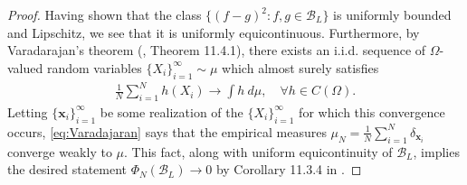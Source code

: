 \documentclass{article}
\def\vx{{\bm{x}}}
\def\cB{{\mathcal{B}}}
\begin{document}
\begin{appendices}
\begin{proof}
    Having shown that the class $\{ (f-g)^2: f,g \in \cB_L \}$ is uniformly bounded and Lipschitz, we see that it is uniformly equicontinuous. Furthermore, by Varadarajan's theorem (\cite{dudley2002real}, Theorem 11.4.1), there exists an i.i.d. sequence of $\Omega$-valued random variables $\{ X_i \}_{i=1}^\infty \sim \mu$ which almost surely satisfies
    \begin{align} \label{eq:Varadajaran}
        \frac{1}{N} \sum_{i=1}^N h(X_i) \to \int h \ d \mu, \quad \forall h \in C(\Omega).
    \end{align}
    Letting $\{ \vx_i \}_{i=1}^\infty$ be some realization of the $\{ X_i \}_{i=1}^\infty$ for which this convergence occurs, \eqref{eq:Varadajaran} says that the empirical measures $\mu_N = \frac{1}{N} \sum_{i=1}^N \delta_{\vx_i}$ converge weakly to $\mu$. This fact, along with uniform equicontinuity of $\cB_L$, implies the desired statement $\Phi_N(\cB_L) \to 0$ by Corollary 11.3.4 in \cite{dudley2002real}.


\end{proof}
\end{appendices}
\end{document}
